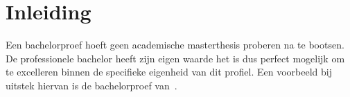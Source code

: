 \chapter{Inleiding}
\label{sec:inleiding}


%
%
%
%
%
%

Een bachelorproef hoeft geen academische masterthesis proberen na te bootsen. De professionele bachelor heeft zijn eigen waarde het is dus perfect mogelijk om te excelleren binnen de specifieke eigenheid van dit profiel. Een voorbeeld bij uitstek hiervan is de bachelorproef van~\cite{VanDerPlaetsen2013}.
